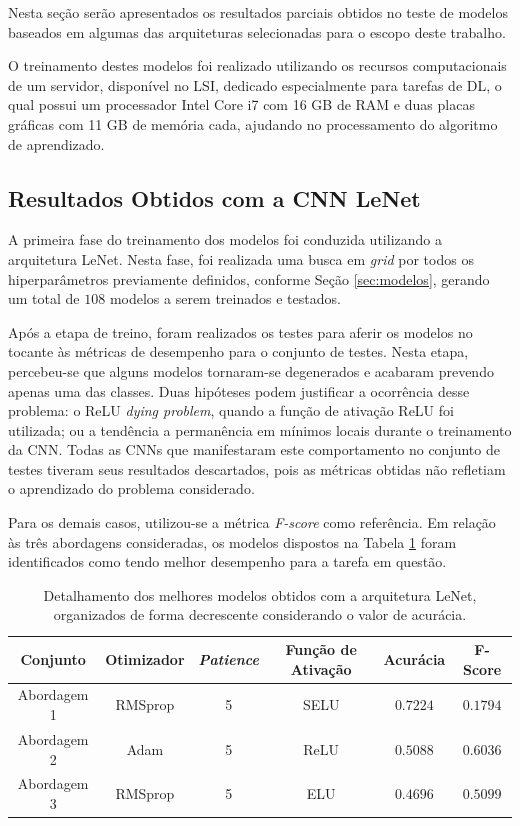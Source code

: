 
Nesta seção serão apresentados os resultados parciais obtidos no teste de modelos baseados em algumas das arquiteturas selecionadas para o escopo deste trabalho. 

O treinamento destes modelos foi realizado utilizando os recursos computacionais de um servidor, disponível no LSI, dedicado especialmente para tarefas de DL, o qual possui um processador Intel Core i7 com 16 GB de RAM e duas placas gráficas com 11 GB de memória cada, ajudando no processamento do algoritmo de aprendizado.


\subsection{Resultados Obtidos com a CNN LeNet}
\label{sec:lenet}

A primeira fase do treinamento dos modelos foi conduzida utilizando a arquitetura LeNet. Nesta fase, foi realizada uma busca em \emph{grid} por todos os hiperparâmetros previamente definidos, conforme Seção \ref{sec:modelos}, gerando um total de $108$ modelos a serem treinados e testados.

Após a etapa de treino, foram realizados os testes para aferir os modelos no tocante às métricas de desempenho para o conjunto de testes. Nesta etapa, percebeu-se que alguns modelos tornaram-se degenerados e acabaram prevendo apenas uma das classes. Duas hipóteses podem justificar a ocorrência desse problema: o ReLU \emph{dying problem}, quando a função de ativação ReLU foi utilizada; ou a tendência a permanência em mínimos locais durante o treinamento da CNN. Todas as CNNs que manifestaram este comportamento no conjunto de testes tiveram seus resultados descartados, pois as métricas obtidas não refletiam o aprendizado do problema considerado.

Para os demais casos, utilizou-se a métrica \emph{F-score} como referência. Em relação às três abordagens consideradas, os modelos dispostos na Tabela \ref{tab:lenet} foram identificados como tendo melhor desempenho para a tarefa em questão.

\begin{table}[h!]
\centering
\caption{Detalhamento dos melhores modelos obtidos com a arquitetura LeNet, organizados de forma decrescente considerando o valor de acurácia.}
\label{tab:lenet}
\begin{tabular}{cccccc}
\toprule
\textbf{Conjunto} & \textbf{Otimizador} & \textbf{\emph{Patience}}  & \textbf{Função de Ativação} & \textbf{Acurácia} & \textbf{F-Score} \\
\midrule
Abordagem 1 & RMSprop & 5 & SELU & $0.7224$ & $0.1794$ \\
Abordagem 2 & Adam & 5 & ReLU & $0.5088$ & $0.6036$ \\
Abordagem 3 & RMSprop & 5 & ELU & $0.4696$ & $0.5099$ \\
\bottomrule
\end{tabular}
\end{table}



